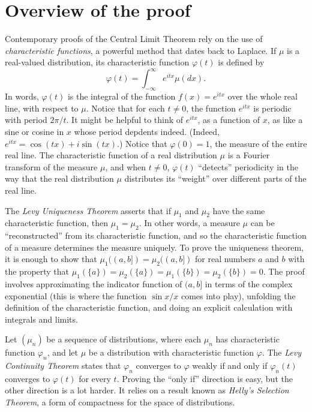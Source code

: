 \documentclass{article}
\newcommand{\ph}{\varphi}
\begin{document}
\section{Overview of the proof}

Contemporary proofs of the Central Limit Theorem rely on the use of \emph{characteristic functions}, a powerful method that dates back to Laplace. If $\mu$ is a real-valued distribution, its characteristic function $\ph(t)$ is defined by
\[
\ph(t) = \int_{-\infty}^{\infty} e^{itx} \mu(dx).
\]
In words, $\ph(t)$ is the integral of the function $f(x) = e^{itx}$ over the whole real line, with respect to $\mu$. Notice that for each $t \neq 0$, the function $e^{itx}$ is periodic with period $2 \pi / t$. It might be helpful to think of $e^{itx}$, as a function of $x$, as like a sine or cosine in $x$ whose period depdents indeed. (Indeed, $e^{itx}= \cos (t x) + i \sin (t x)$.) Notice that $\ph(0) = 1$, the measure of the entire real line. The characteristic function of a real distribution $\mu$ is a Fourier transform of the measure $\mu$, and when $t \neq 0$, $\ph(t)$ ``detects'' periodicity in the way that the real distribution $\mu$ distributes its ``weight'' over different parts of the real line. 

The \emph{Levy Uniqueness Theorem} asserts that if $\mu_1$ and $\mu_2$ have the same characteristic function, then $\mu_1 = \mu_2$. In other words, a measure $\mu$ can be ``reconstructed'' from its characteristic function, and so the characteristic function of a measure determines the measure uniquely. To prove the uniqueness theorem, it is enough to show that $\mu_1((a,b]) = \mu_2((a,b])$ for real numbers $a$ and $b$ with the property that $\mu_1(\{a\}) = \mu_2(\{a\}) = \mu_1(\{b\}) = \mu_2(\{b\}) = 0$. The proof involves approximating the indicator function of $(a,b]$ in terms of the complex exponential (this is where the function $\sin x / x$ comes into play), unfolding the definition of the characteristic function, and doing an explicit calculation with integrals and limits.

Let $(\mu_n)$ be a sequence of distributions, where each $\mu_n$ has characteristic function $\ph_n$, and let $\mu$ be a distribution with characteristic function $\ph$. The \emph{Levy Continuity Theorem} states that $\ph_n$ converges to $\ph$ weakly if and only if $\ph_n(t)$ converges to $\ph(t)$ for every $t$. Proving the ``only if'' direction is easy, but the other direction is a lot harder. It relies on a result known as \emph{Helly's Selection Theorem}, a form of compactness for the space of distributions.
\end{document}

